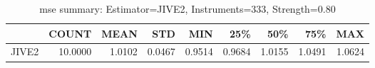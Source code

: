 \begin{table}[ht]
\centering
\caption{mse summary: Estimator=JIVE2, Instruments=333, Strength=0.80}
\begin{tabular}{lrrrrrrrr}
\toprule
 & COUNT & MEAN & STD & MIN & 25\% & 50\% & 75\% & MAX \\
\midrule
JIVE2 & 10.0000 & 1.0102 & 0.0467 & 0.9514 & 0.9684 & 1.0155 & 1.0491 & 1.0624 \\
\bottomrule
\end{tabular}
\end{table}
